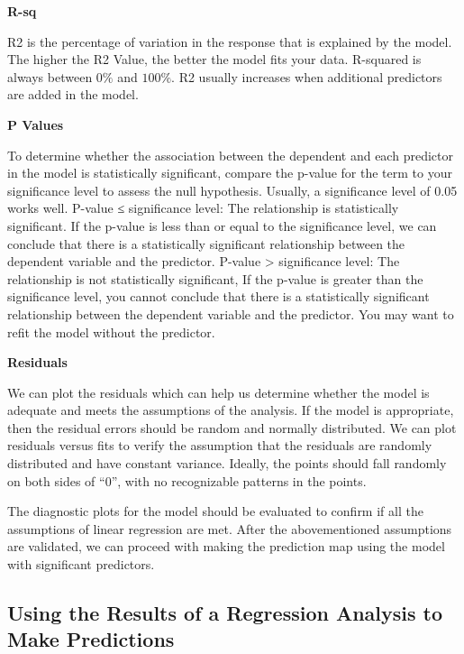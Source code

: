 \documentclass[10pt,b5paper,]{book}
\theoremstyle{definition}
\theoremstyle{definition}
\theoremstyle{definition}
\theoremstyle{remark}
\begin{document}
\textbf{R-sq}

R2 is the percentage of variation in the response that is explained by
the model. The higher the R2 Value, the better the model fits your data.
R-squared is always between \(0\%\) and \(100\%\). R2 usually increases
when additional predictors are added in the model.

\textbf{P Values}

To determine whether the association between the dependent and each
predictor in the model is statistically significant, compare the p-value
for the term to your significance level to assess the null hypothesis.
Usually, a significance level of 0.05 works well. P-value ≤ significance
level: The relationship is statistically significant. If the p-value is
less than or equal to the significance level, we can conclude that there
is a statistically significant relationship between the dependent
variable and the predictor. P-value \textgreater{} significance level:
The relationship is not statistically significant, If the p-value is
greater than the significance level, you cannot conclude that there is a
statistically significant relationship between the dependent variable
and the predictor. You may want to refit the model without the
predictor.

\textbf{Residuals}

We can plot the residuals which can help us determine whether the model
is adequate and meets the assumptions of the analysis. If the model is
appropriate, then the residual errors should be random and normally
distributed. We can plot residuals versus fits to verify the assumption
that the residuals are randomly distributed and have constant variance.
Ideally, the points should fall randomly on both sides of ``0'', with no
recognizable patterns in the points.

The diagnostic plots for the model should be evaluated to confirm if all
the assumptions of linear regression are met. After the abovementioned
assumptions are validated, we can proceed with making the prediction map
using the model with significant predictors.

\hypertarget{using-the-results-of-a-regression-analysis-to-make-predictions}{%
\subsection{Using the Results of a Regression Analysis to Make
Predictions}\label{using-the-results-of-a-regression-analysis-to-make-predictions}}
\end{document}
